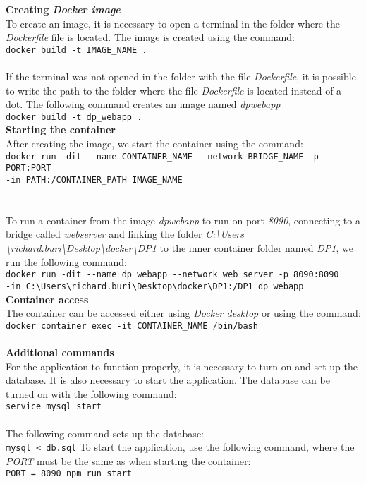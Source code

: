 \textbf{Creating \textit{Docker image}}\\
To create an image, it is necessary to open a terminal in the folder where the \textit{Dockerfile} file is located. The image is created using the command:\\
\indent \verb|docker build -t IMAGE_NAME . |\\\\
If the terminal was not opened in the folder with the file \textit{Dockerfile}, it is possible to write the path to the folder where the file \textit{Dockerfile} is located instead of a dot. The following command creates an image named \textit{dp\textunderscore webapp}\\
\indent \verb|docker build -t dp_webapp .|\\

\textbf{Starting the container}\\
After creating the image, we start the container using the command: \\
\indent \verb|docker run -dit --name CONTAINER_NAME --network BRIDGE_NAME -p PORT:PORT|\\
\indent \verb|-in PATH:/CONTAINER_PATH IMAGE_NAME| \\\\ \pagebreak \\
To run a container from the image \textit{dp\textunderscore webapp} to run on port \textit{8090}, connecting to a bridge called \textit{web\textunderscore server} and linking the folder \textit{C:\textbackslash Users \textbackslash richard.buri\textbackslash Desktop\textbackslash docker\textbackslash DP1} to the inner container folder named \textit{DP1}, we run the following command: \\
\indent \verb|docker run -dit --name dp_webapp --network web_server -p 8090:8090| \\
\indent \verb|-in C:\Users\richard.buri\Desktop\docker\DP1:/DP1 dp_webapp|\\

\textbf{Container access}\\
The container can be accessed either using \textit{Docker desktop} or using the command:\\
\indent \verb|docker container exec -it CONTAINER_NAME /bin/bash|\\\\

\textbf{Additional commands}\\
For the application to function properly, it is necessary to turn on and set up the database. It is also necessary to start the application. The database can be turned on with the following command:\\
\indent \verb|service mysql start|\\\\
The following command sets up the database:\\
\indent \verb|mysql < db.sql|
To start the application, use the following command, where the \textit{PORT} must be the same as when starting the container:\\
\indent \verb|PORT = 8090 npm run start|

